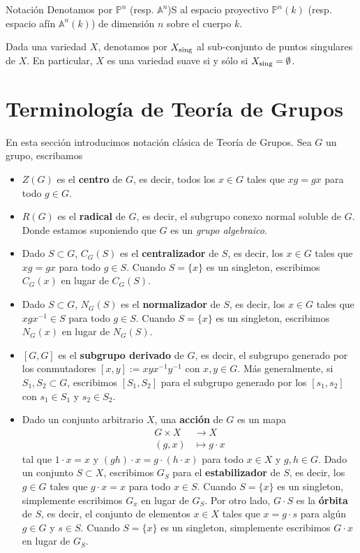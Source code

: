 \documentclass[spanish,10pt]{amsart}
\makeatletter
\renewcommand\subsection{\@startsection{subsection}{2}%
  \z@{.5\linespacing\@plus.7\linespacing}{-.5em}%
  {\normalfont\sffamily}}
\theoremstyle{definition}
\theoremstyle{remark}
\numberwithin{equation}{section}
\makeatother
\begin{document}
\subsection{Notación}
Denotamos por $\mathbb{P}^n$ (resp. $\mathbb{A}^n$)S al espacio proyectivo $\mathbb{P}^n(k)$ (resp. espacio afín $\mathbb{A}^n(k)$) de dimensión $n$ sobre el cuerpo $k$.

Dada una variedad $X$, denotamos por $X_{\textup{sing}}$ al sub-conjunto de puntos singulares de $X$. En particular, $X$ es una variedad suave si y sólo si $X_{\textup{sing}}=\emptyset$.

\section{Terminología de Teoría de Grupos}
En esta sección introducimos notación clásica de Teoría de Grupos. Sea $G$ un grupo, escribamos
\begin{itemize}
\item $Z(G)$ es el \textbf{centro} de $G$, es decir, todos los $x \in G$ tales que $x g = g x$ para todo $g \in G$.
\item $R(G)$ es el \textbf{radical} de $G$, es decir, el subgrupo conexo normal soluble de $G$. Donde estamos suponiendo que $G$ es un \textit{grupo algebraico}.
\item Dado $S \subset G$, $C_G (S)$ es el \textbf{centralizador} de $S$, es decir, los $x \in G$ tales que $x g = g x$ para todo $g \in S$. Cuando $S = \{x\}$ es un singleton, escribimos $C_G (x)$ en lugar de $C_G (S)$.
\item Dado $S \subset G$, $N_G (S)$ es el \textbf{normalizador} de $S$, es decir, los $x \in G$ tales que $x g x^{-1} \in S$ para todo $g \in S$. Cuando $S = \{x\}$ es un singleton, escribimos $N_G (x)$ en lugar de $N_G (S)$.
\item $[G,G]$ es el \textbf{subgrupo derivado} de $G$, es decir, el subgrupo generado por los conmutadores $[x,y] := x y x^{-1}y^{-1}$ con $x,y \in G$. Más generalmente, si $S_1, S_2 \subset G$, escribimos $[S_1, S_2]$ para el subgrupo generado por los $[s_1,s_2]$ con $s_1 \in S_1 $ y $s_2 \in S_2$.
\item Dado un conjunto arbitrario $X$, una \textbf{acción} de $G$ es un mapa
\begin{align*}
G \times X &\longrightarrow X \\
(g,x) &\longmapsto g \cdot x
\end{align*}
tal que $1 \cdot x = x$ y $(gh) \cdot x = g \cdot (h \cdot x)$ para todo $x \in X$ y $g,h \in G$. Dado un conjunto $S \subset X$, escribimos $G_S$ para el \textbf{estabilizador} de $S$, es decir, los $g \in G$ tales que $g \cdot x = x$ para todo $x \in S$. Cuando $S = \{x\}$ es un singleton, simplemente escribimos $G_x$ en lugar de $G_S$. Por otro lado, $G \cdot S$ es la \textbf{órbita} de $S$, es decir, el conjunto de elementos $x \in X$ tales que $x = g \cdot s$ para algún $g \in G$ y $s \in S$. Cuando $S = \{x\}$ es un singleton, simplemente escribimos $G \cdot x$ en lugar de $G_S$.
\end{itemize}
\end{document}
